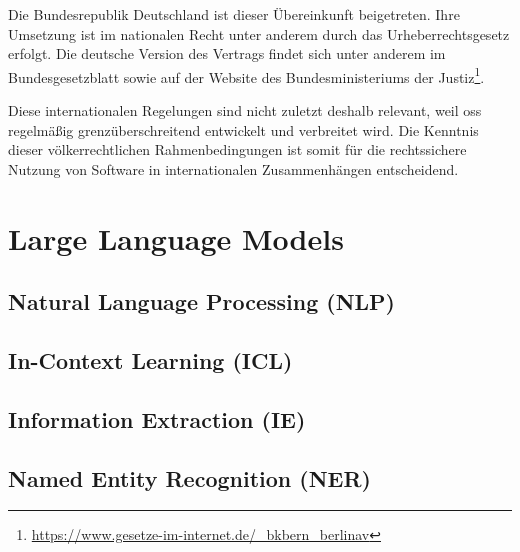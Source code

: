 Die Bundesrepublik Deutschland ist dieser Übereinkunft beigetreten.
Ihre Umsetzung ist im nationalen Recht unter anderem durch das Urheberrechtsgesetz erfolgt.
Die deutsche Version des Vertrags findet sich unter anderem im Bundesgesetzblatt sowie auf der Website des Bundesministeriums der Justiz\footnote{\url{https://www.gesetze-im-internet.de/\_bkbern\_berlinav}}.

Diese internationalen Regelungen sind nicht zuletzt deshalb relevant, weil \gls{oss} regelmäßig grenzüberschreitend entwickelt und verbreitet wird.
Die Kenntnis dieser völkerrechtlichen Rahmenbedingungen ist somit für die rechtssichere Nutzung von Software in internationalen Zusammenhängen entscheidend.


\section{Large Language Models}


\subsection{Natural Language Processing (NLP)}


\subsection{In-Context Learning (ICL)}


\subsection{Information Extraction (IE)}


\subsection{Named Entity Recognition (NER)}


